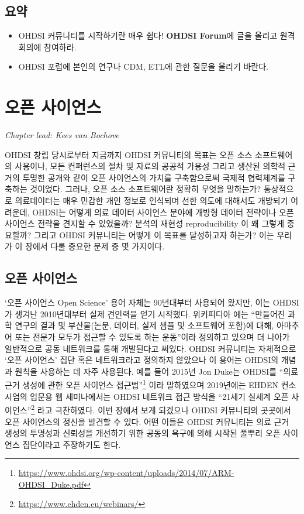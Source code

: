 \documentclass[10.5pt]{book}
\let\rmarkdownfootnote\footnote%
\def\footnote{\protect\rmarkdownfootnote}
\theoremstyle{definition}
\theoremstyle{definition}
\theoremstyle{definition}
\theoremstyle{remark}
\let\BeginKnitrBlock\begin \let\EndKnitrBlock\end
\begin{document}
\section{요약}\label{-1}

\BeginKnitrBlock{rmdsummary}
\begin{itemize}
\item
  OHDSI 커뮤니티를 시작하기란 매우 쉽다! \textbf{OHDSI Forum}에 글을
  올리고 원격 회의에 참여하라.
\item
  OHDSI 포럼에 본인의 연구나 CDM, ETL에 관한 질문을 올리기 바란다.
\end{itemize}
\EndKnitrBlock{rmdsummary}

\chapter{오픈 사이언스}\label{OpenScience}


\emph{Chapter lead: Kees van Bochove}

OHDSI 창립 당시로부터 지금까지 OHDSI 커뮤니티의 목표는 오픈 소스
소프트웨어의 사용이나, 모든 컨퍼런스의 절차 및 자료의 공공적 가용성
그리고 생산된 의학적 근거의 투명한 공개와 같이 오픈 사이언스의 가치를
구축함으로써 국제적 협력체계를 구축하는 것이었다. 그러나, 오픈 소스
소프트웨어란 정확히 무엇을 말하는가? 통상적으로 의료데이터는 매우 민감한
개인 정보로 인식되며 선한 의도에 대해서도 개방되기 어려운데, OHDSI는
어떻게 의료 데이터 사이언스 분야에 개방형 데이터 전략이나 오픈 사이언스
전략을 견지할 수 있었을까? 분석의 재현성 reproducibility 이 왜 그렇게
중요할까? 그리고 OHDSI 커뮤니티는 어떻게 이 목표를 달성하고자 하는가?
이는 우리가 이 장에서 다룰 중요한 문제 중 몇 가지이다.

\section{오픈 사이언스}\label{-}

`오픈 사이언스 Open Science' 용어 자체는 90년대부터 사용되어 왔지만,
이는 OHDSI가 생겨난 2010년대부터 실제 견인력을 얻기 시작했다. 위키피디아
\citep{wiki:Open_science} 에는 ``만들어진 과학 연구의 결과 및
부산물(논문, 데이터, 실제 샘플 및 소프트웨어 포함)에 대해, 아마추어 또는
전문가 모두가 접근할 수 있도록 하는 운동''이라 정의하고 있으며 더 나아가
일반적으로 공동 네트워크를 통해 개발된다고 써있다. OHDSI 커뮤니티는
자체적으로 `오픈 사이언스' 집단 혹은 네트워크라고 정의하지 않았으나 이
용어는 OHDSI의 개념과 원칙을 사용하는 데 자주 사용된다. 예를 들어 2015년
Jon Duke는 OHDSI를 ``의료 근거 생성에 관한 오픈 사이언스
접근법''\footnote{\url{https://www.ohdsi.org/wp-content/uploads/2014/07/ARM-OHDSI_Duke.pdf}}
이라 말하였으며 2019년에는 EHDEN 컨소시엄의 입문용 웹 세미나에서는 OHDSI
네트워크 접근 방식을 ``21세기 실세계 오픈 사이언스''\footnote{\url{https://www.ehden.eu/webinars/}}
라고 극찬하였다. 이번 장에서 보게 되겠으나 OHDSI 커뮤니티의 곳곳에서
오픈 사이언스의 정신을 발견할 수 있다. 어떤 이들은 OHDSI 커뮤니티는 의료
근거 생성의 투명성과 신뢰성을 개선하기 위한 공동의 욕구에 의해 시작된
풀뿌리 오픈 사이언스 집단이라고 주장하기도 한다.
\end{document}
